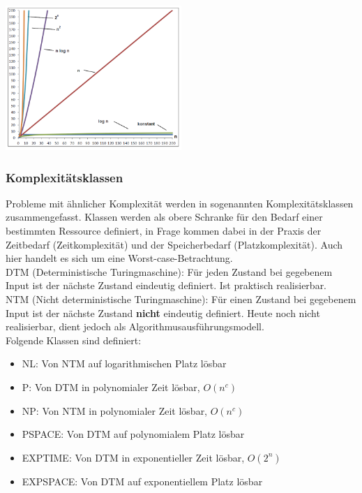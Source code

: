 \includegraphics[width=0.5\textwidth]{images/Algorithmen/Wachstumsfunktionen.png}

\subsubsection{Komplexitätsklassen}
Probleme mit ähnlicher Komplexität werden in sogenannten Komplexitätsklassen zusammengefasst. Klassen werden als obere Schranke für den Bedarf einer bestimmten Ressource definiert, in Frage kommen dabei in der Praxis der Zeitbedarf (Zeitkomplexität) und der Speicherbedarf (Platzkomplexität). Auch hier handelt es sich um eine Worst-case-Betrachtung.\\

DTM (Deterministische Turingmaschine): Für jeden Zustand bei gegebenem Input ist der nächste Zustand eindeutig definiert. Ist praktisch realisierbar.\\

NTM (Nicht deterministische Turingmaschine): Für einen Zustand bei gegebenem Input ist der nächste Zustand \textbf{nicht} eindeutig definiert. Heute noch nicht realisierbar, dient jedoch als Algorithmusausführungsmodell.\\

Folgende Klassen sind definiert:
\begin{itemize}
\item NL:       Von NTM auf logarithmischen Platz lösbar 
\item P:        Von DTM in polynomialer Zeit lösbar, $O(n^c)$
\item NP:       Von NTM in polynomialer Zeit lösbar, $O(n^c)$
\item PSPACE:   Von DTM auf polynomialem Platz lösbar
\item EXPTIME:  Von DTM in exponentieller Zeit lösbar, $O(2^n)$
\item EXPSPACE: Von DTM auf exponentiellem Platz lösbar
\end{itemize}

